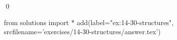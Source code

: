 
\begin{ex}
  \label{ex:14-30-structures}
  
  \qed
\end{ex}
\begin{python0}
from solutions import *
add(label="ex:14-30-structures",
    srcfilename='exercises/14-30-structures/answer.tex')
\end{python0}
